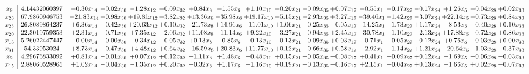 \documentclass[9pt]{article}
\begin{document}
 \[\begin{array}{c| c c@{\hskip 2pt} c@{\hskip 2pt} c@{\hskip 2pt} c@{\hskip 2pt} c@{\hskip 2pt} c@{\hskip 2pt} c@{\hskip 2pt} c@{\hskip 2pt} c@{\hskip 2pt} c@{\hskip 2pt} c@{\hskip 2pt} c@{\hskip 2pt} c@{\hskip 2pt} c@{\hskip 2pt} c@{\hskip 2pt} c@{\hskip 2pt} }
 x_{9}   &  4.14432060397 & -0.30 x_{14} & +  0.02 x_{30} & -1.28 x_{12} & -0.09 x_{32} & +  0.84 x_{8} & -1.55 x_{6} & +  1.10 x_{10} & -0.20 x_{21} & -0.09 x_{35} & +  0.07 x_{17} & -0.55 x_{1} & -0.17 x_{27} & -0.17 x_{24} & +  1.26 x_{5} & -0.04 x_{28} & +  0.02 x_{33}\\
 x_{26}   &  67.9860946753 & -21.83 x_{14} & +  0.98 x_{30} & + 19.81 x_{12} & -3.82 x_{32} & + 13.36 x_{8} & -35.98 x_{6} & + 19.17 x_{10} & -5.15 x_{21} & -2.93 x_{35} & +  3.27 x_{17} & -39.46 x_{1} & -1.42 x_{27} & -3.07 x_{24} & + 22.14 x_{5} & -0.73 x_{28} & +  0.84 x_{33}\\
 x_{23}   &  26.8089864237 & +  6.36 x_{14} & -0.42 x_{30} & + 20.63 x_{12} & +  0.10 x_{32} & -21.73 x_{8} & + 14.96 x_{6} & -11.01 x_{10} & +  1.06 x_{21} & +  0.25 x_{35} & -0.05 x_{17} & -14.25 x_{1} & +  1.73 x_{27} & +  1.17 x_{24} & -8.53 x_{5} & -0.40 x_{28} & +  0.10 x_{33}\\
 x_{20}   &  22.3019759353 & +  2.31 x_{14} & +  0.71 x_{30} & +  7.35 x_{12} & -2.06 x_{32} & + 11.08 x_{8} & -11.14 x_{6} & +  9.22 x_{10} & -3.27 x_{21} & -0.94 x_{35} & +  2.45 x_{17} & -30.78 x_{1} & -1.10 x_{27} & -2.13 x_{24} & + 17.88 x_{5} & -0.72 x_{28} & +  0.86 x_{33}\\
 x_{13}   &  5.26022447447 & -0.00 x_{14} & -0.00 x_{30} & -0.34 x_{12} & -0.05 x_{32} & +  0.13 x_{8} & -0.85 x_{6} & -0.13 x_{10} & -0.13 x_{21} & -0.09 x_{35} & +  0.03 x_{17} & -0.71 x_{1} & -0.05 x_{27} & -0.12 x_{24} & +  0.76 x_{5} & -0.03 x_{28} & +  0.00 x_{33}\\
 x_{31}   &  54.33953024 & +  8.73 x_{14} & +  0.47 x_{30} & +  4.48 x_{12} & +  0.64 x_{32} & -16.59 x_{8} & + 20.83 x_{6} & + 11.77 x_{10} & +  0.12 x_{21} & +  0.66 x_{35} & +  0.58 x_{17} & -2.92 x_{1} & +  1.14 x_{27} & +  1.21 x_{24} & -20.64 x_{5} & -1.03 x_{28} & -0.37 x_{33}\\
 x_{2}   &  4.29676833092 & +  0.81 x_{14} & -0.01 x_{30} & +  0.07 x_{12} & +  0.12 x_{32} & -1.11 x_{8} & +  1.48 x_{6} & -0.48 x_{10} & +  0.15 x_{21} & +  0.05 x_{35} & -0.08 x_{17} & +  0.41 x_{1} & +  0.09 x_{27} & +  0.12 x_{24} & -1.69 x_{5} & -0.06 x_{28} & -0.03 x_{33}\\
 x_{15}   &  2.88060528965 & +  1.02 x_{14} & -0.04 x_{30} & -1.35 x_{12} & +  0.20 x_{32} & -0.32 x_{8} & +  1.17 x_{6} & -1.16 x_{10} & +  0.19 x_{21} & +  0.13 x_{35} & -0.16 x_{17} & +  2.15 x_{1} & +  0.04 x_{27} & +  0.13 x_{24} & -1.66 x_{5} & +  0.02 x_{28} & -0.07 x_{33}\\

\end{array}\]
\end{document}

